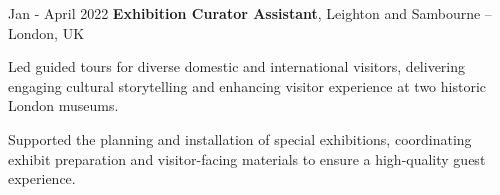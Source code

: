 \vspace{0.20 cm}
\begin{twocolentry}{
        Jan - April 2022
    }
    {\ResumeEntryTitleFont\textbf{Exhibition Curator Assistant}}, {\ResumeEntryMetaFont Leighton and Sambourne -- London, UK}
\end{twocolentry}

\vspace{0.10 cm}
\begin{onecolentry}
    \begin{highlights}
        \item {\ResumeBulletFont Led guided tours for diverse domestic and international visitors, delivering engaging cultural storytelling and enhancing visitor experience at two historic London museums.}
        \item {\ResumeBulletFont Supported the planning and installation of special exhibitions, coordinating exhibit preparation and visitor-facing materials to ensure a high-quality guest experience.}
    \end{highlights}
\end{onecolentry}
